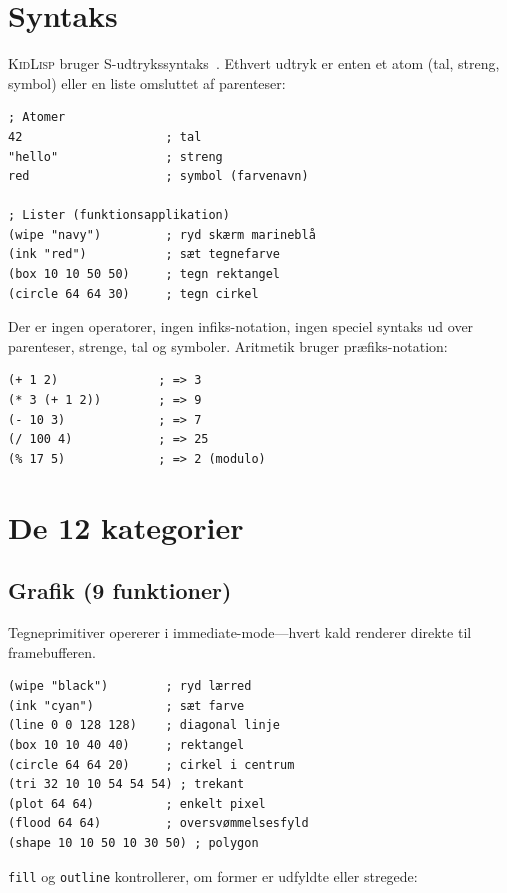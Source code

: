 \documentclass[10pt,letterpaper,twocolumn]{article}
\newcommand{\kl}{\textsc{KidLisp}}
\begin{document}
\section{Syntaks}

\kl{} bruger S-udtrykssyntaks~\citep{mccarthy1960recursive}. Ethvert udtryk er enten et atom (tal, streng, symbol) eller en liste omsluttet af parenteser:

\begin{lstlisting}
; Atomer
42                    ; tal
"hello"               ; streng
red                   ; symbol (farvenavn)

; Lister (funktionsapplikation)
(wipe "navy")         ; ryd skærm marineblå
(ink "red")           ; sæt tegnefarve
(box 10 10 50 50)     ; tegn rektangel
(circle 64 64 30)     ; tegn cirkel
\end{lstlisting}

Der er ingen operatorer, ingen infiks-notation, ingen speciel syntaks ud over parenteser, strenge, tal og symboler. Aritmetik bruger præfiks-notation:

\begin{lstlisting}
(+ 1 2)              ; => 3
(* 3 (+ 1 2))        ; => 9
(- 10 3)             ; => 7
(/ 100 4)            ; => 25
(% 17 5)             ; => 2 (modulo)
\end{lstlisting}

\section{De 12 kategorier}

\subsection{Grafik (9 funktioner)}

Tegneprimitiver opererer i immediate-mode---hvert kald renderer direkte til framebufferen.

\begin{lstlisting}
(wipe "black")        ; ryd lærred
(ink "cyan")          ; sæt farve
(line 0 0 128 128)    ; diagonal linje
(box 10 10 40 40)     ; rektangel
(circle 64 64 20)     ; cirkel i centrum
(tri 32 10 10 54 54 54) ; trekant
(plot 64 64)          ; enkelt pixel
(flood 64 64)         ; oversvømmelsesfyld
(shape 10 10 50 10 30 50) ; polygon
\end{lstlisting}

\texttt{fill} og \texttt{outline} kontrollerer, om former er udfyldte eller stregede:
\end{document}
